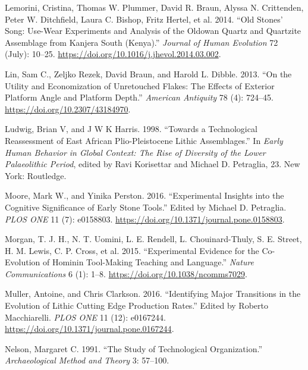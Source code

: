 \documentclass[]{elsarticle} %
\begin{document}
\leavevmode\hypertarget{ref-lemoriniOldStonesSong2014}{}%
Lemorini, Cristina, Thomas W. Plummer, David R. Braun, Alyssa N.
Crittenden, Peter W. Ditchfield, Laura C. Bishop, Fritz Hertel, et al.
2014. ``Old Stones' Song: Use-Wear Experiments and Analysis of the
Oldowan Quartz and Quartzite Assemblage from Kanjera South (Kenya).''
\emph{Journal of Human Evolution} 72 (July): 10--25.
\url{https://doi.org/10.1016/j.jhevol.2014.03.002}.

\leavevmode\hypertarget{ref-linUtilityEconomizationUnretouched2013}{}%
Lin, Sam C., Zeljko Rezek, David Braun, and Harold L. Dibble. 2013. ``On
the Utility and Economization of Unretouched Flakes: The Effects of
Exterior Platform Angle and Platform Depth.'' \emph{American Antiquity}
78 (4): 724--45. \url{https://doi.org/10.2307/43184970}.

\leavevmode\hypertarget{ref-ludwigTechnologicalReassessmentEast1998}{}%
Ludwig, Brian V, and J W K Harris. 1998. ``Towards a Technological
Reassessment of East African Plio-Pleistocene Lithic Assemblages.'' In
\emph{Early Human Behavior in Global Context: The Rise of Diversity of
the Lower Palaeolithic Period}, edited by Ravi Korisettar and Michael D.
Petraglia, 23. New York: Routledge.

\leavevmode\hypertarget{ref-mooreExperimentalInsightsCognitive2016}{}%
Moore, Mark W., and Yinika Perston. 2016. ``Experimental Insights into
the Cognitive Significance of Early Stone Tools.'' Edited by Michael D.
Petraglia. \emph{PLOS ONE} 11 (7): e0158803.
\url{https://doi.org/10.1371/journal.pone.0158803}.

\leavevmode\hypertarget{ref-morganExperimentalEvidenceCoevolution2015}{}%
Morgan, T. J. H., N. T. Uomini, L. E. Rendell, L. Chouinard-Thuly, S. E.
Street, H. M. Lewis, C. P. Cross, et al. 2015. ``Experimental Evidence
for the Co-Evolution of Hominin Tool-Making Teaching and Language.''
\emph{Nature Communications} 6 (1): 1--8.
\url{https://doi.org/10.1038/ncomms7029}.

\leavevmode\hypertarget{ref-mullerIdentifyingMajorTransitions2016}{}%
Muller, Antoine, and Chris Clarkson. 2016. ``Identifying Major
Transitions in the Evolution of Lithic Cutting Edge Production Rates.''
Edited by Roberto Macchiarelli. \emph{PLOS ONE} 11 (12): e0167244.
\url{https://doi.org/10.1371/journal.pone.0167244}.

\leavevmode\hypertarget{ref-nelsonStudyTechnologicalOrganization1991}{}%
Nelson, Margaret C. 1991. ``The Study of Technological Organization.''
\emph{Archaeological Method and Theory} 3: 57--100.
\end{document}
